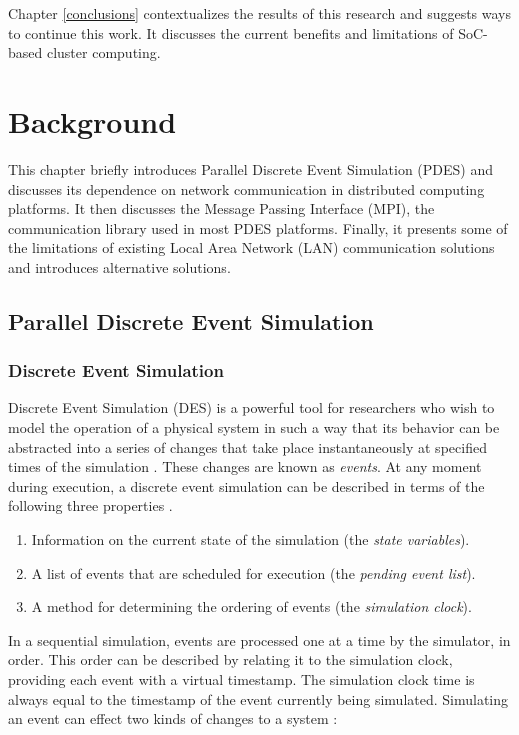 \documentclass[11pt]{book}
\begin{document}
Chapter \ref{conclusions} contextualizes the results of this research and suggests ways to
continue this work. It discusses the current benefits and limitations of SoC-based cluster
computing.

\chapter{Background}\label{background}

This chapter briefly introduces Parallel Discrete Event Simulation (PDES) and discusses
its dependence on network communication in distributed computing platforms.  It then
discusses the Message Passing Interface (MPI), the communication library used in most PDES
platforms.  Finally, it presents some of the limitations of existing Local Area Network
(LAN) communication solutions and introduces alternative solutions.

\section{Parallel Discrete Event Simulation}

\subsection{Discrete Event Simulation}

Discrete Event Simulation (DES) is a powerful tool for researchers who wish to model the
operation of a physical system in such a way that its behavior can be abstracted into a
series of changes that take place instantaneously at specified times of the simulation
\cite{jacob-13}.  These changes are known as \textit{events}. At any moment during
execution, a discrete event simulation can be described in terms of the following three
properties \cite{fujimoto-pdes,jacob-13,page-94}.

\begin{enumerate}
  \item Information on the current state of the simulation (the \textit{state variables}).
  \item A list of events that are scheduled for execution (the \textit{pending event
    list}).
  \item A method for determining the ordering of events (the \textit{simulation clock}).
\end{enumerate}

\noindent
In a sequential simulation, events are processed one at a time by the simulator, in order.
This order can be described by relating it to the simulation clock, providing each event
with a virtual timestamp.  The simulation clock time is always equal to the timestamp of
the event currently being simulated.  Simulating an event can effect two kinds of changes
to a system \cite{fujimoto-pdes}:
\end{document}
